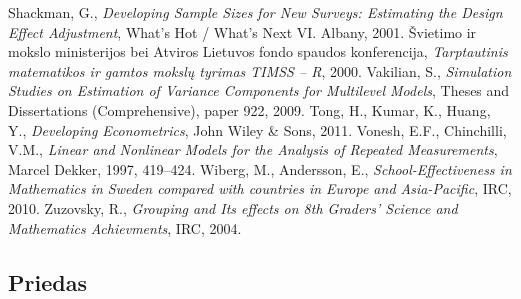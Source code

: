 \documentclass[12pt,a4paper]{article}
\begin{document}
\begin{thebibliography}{1}
 Shackman, G., \textit{Developing Sample Sizes for New Surveys: Estimating the Design Effect Adjustment}, What’s Hot / What’s Next VI. Albany, 2001.
 Švietimo ir mokslo ministerijos bei Atviros Lietuvos fondo spaudos konferencija, \textit{Tarptautinis matematikos ir gamtos mokslų tyrimas TIMSS – R}, 2000.
 Vakilian, S., \textit{Simulation Studies on Estimation of Variance Components for Multilevel Models}, Theses and Dissertations (Comprehensive), paper 922, 2009.
 Tong, H., Kumar, K., Huang, Y., \textit{Developing Econometrics}, John Wiley \& Sons, 2011.
 Vonesh, E.F., Chinchilli, V.M., \textit{ Linear and Nonlinear Models for the Analysis of Repeated Measurements}, Marcel Dekker, 1997, 419–424.
 Wiberg, M., Andersson, E., \textit{School-Effectiveness in Mathematics in Sweden compared with countries in Europe and Asia-Pacific}, IRC, 2010.
 Zuzovsky, R., \textit{Grouping and Its effects on 8th Graders' Science and Mathematics Achievments}, IRC, 2004.
\end{thebibliography}

\newpage
\begin{appendix}

\section*{Priedas}

\end{appendix}

\newpage

\listoftables
 \listoffigures
  
\end{document}
